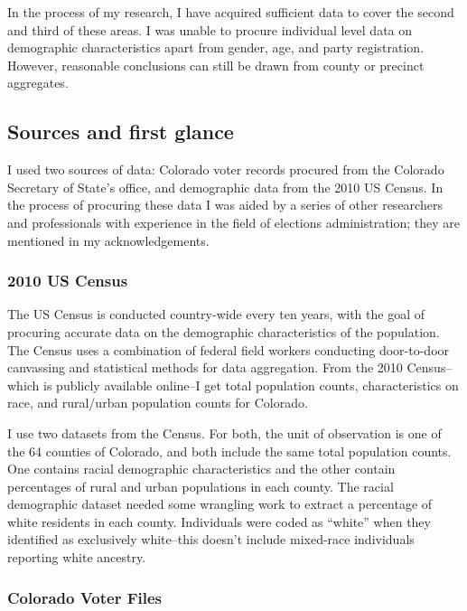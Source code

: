 \documentclass[12pt,twoside]{reedthesis}
\begin{document}
  In the process of my research, I have acquired sufficient data to cover
  the second and third of these areas. I was unable to procure individual
  level data on demographic characteristics apart from gender, age, and
  party registration. However, reasonable conclusions can still be drawn
  from county or precinct aggregates.
  
  \subsection{Sources and first glance}\label{sources-and-first-glance}
  
  I used two sources of data: Colorado voter records procured from the
  Colorado Secretary of State's office, and demographic data from the 2010
  US Census. In the process of procuring these data I was aided by a
  series of other researchers and professionals with experience in the
  field of elections administration; they are mentioned in my
  acknowledgements.
  
  \subsubsection{2010 US Census}\label{us-census}
  
  The US Census is conducted country-wide every ten years, with the goal
  of procuring accurate data on the demographic characteristics of the
  population. The Census uses a combination of federal field workers
  conducting door-to-door canvassing and statistical methods for data
  aggregation. From the 2010 Census--which is publicly available online--I
  get total population counts, characteristics on race, and rural/urban
  population counts for Colorado.
  
  I use two datasets from the Census. For both, the unit of observation is
  one of the 64 counties of Colorado, and both include the same total
  population counts. One contains racial demographic characteristics and
  the other contain percentages of rural and urban populations in each
  county. The racial demographic dataset needed some wrangling work to
  extract a percentage of white residents in each county. Individuals were
  coded as ``white'' when they identified as exclusively white--this
  doesn't include mixed-race individuals reporting white ancestry.
  
  \subsubsection{Colorado Voter Files}\label{colorado-voter-files}
  
\end{document}
